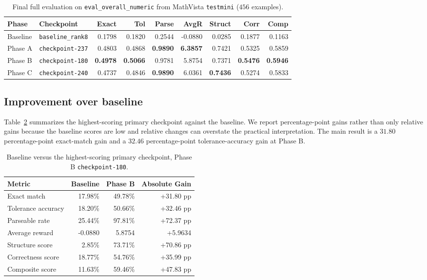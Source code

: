 \documentclass{article} %
\begin{document}
\begin{table}[t]
\centering
\small
\caption{Final full evaluation on \texttt{eval\_overall\_numeric} from MathVista \texttt{testmini} ($456$ examples).}
\label{tab:headline}
\begin{tabular}{llrrrrrrr}
\toprule
Phase & Checkpoint & Exact & Tol & Parse & AvgR & Struct & Corr & Comp \\
\midrule
Baseline & \texttt{baseline\_rank8} & 0.1798 & 0.1820 & 0.2544 & -0.0880 & 0.0285 & 0.1877 & 0.1163 \\
Phase A & \texttt{checkpoint-237} & 0.4803 & 0.4868 & \textbf{0.9890} & \textbf{6.3857} & 0.7421 & 0.5325 & 0.5859 \\
Phase B & \texttt{checkpoint-180} & \textbf{0.4978} & \textbf{0.5066} & 0.9781 & 5.8754 & 0.7371 & \textbf{0.5476} & \textbf{0.5946} \\
Phase C & \texttt{checkpoint-240} & 0.4737 & 0.4846 & \textbf{0.9890} & 6.0361 & \textbf{0.7436} & 0.5274 & 0.5833 \\
\bottomrule
\end{tabular}
\end{table}

\subsection{Improvement over baseline}

Table~\ref{tab:base-final} summarizes the highest-scoring primary checkpoint against the baseline. We report percentage-point gains rather than only relative gains because the baseline scores are low and relative changes can overstate the practical interpretation. The main result is a $31.80$ percentage-point exact-match gain and a $32.46$ percentage-point tolerance-accuracy gain at Phase B.

\begin{table}[t]
\centering
\small
\caption{Baseline versus the highest-scoring primary checkpoint, Phase B \texttt{checkpoint-180}.}
\label{tab:base-final}
\begin{tabular}{lrrr}
\toprule
Metric & Baseline & Phase B & Absolute Gain \\
\midrule
Exact match & 17.98\% & 49.78\% & +31.80 pp \\
Tolerance accuracy & 18.20\% & 50.66\% & +32.46 pp \\
Parseable rate & 25.44\% & 97.81\% & +72.37 pp \\
Average reward & -0.0880 & 5.8754 & +5.9634 \\
Structure score & 2.85\% & 73.71\% & +70.86 pp \\
Correctness score & 18.77\% & 54.76\% & +35.99 pp \\
Composite score & 11.63\% & 59.46\% & +47.83 pp \\
\bottomrule
\end{tabular}
\end{table}
\end{document}

